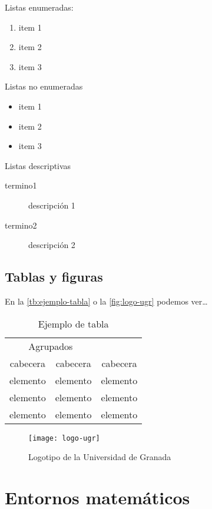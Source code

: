 Listas enumeradas:
\begin{enumerate}
  \item item 1
  \item item 2
  \item item 3
\end{enumerate}

Listas no enumeradas
\begin{itemize}
  \item item 1
  \item item 2
  \item item 3
  \end{itemize}

Listas descriptivas
\begin{description}
  \item[termino1] descripción 1
  \item[termino2] descripción 2
\end{description}

\subsection{Tablas y figuras}

En la \autoref{tb:ejemplo-tabla} o la \autoref{fig:logo-ugr} podemos ver\ldots

\begin{table}[htpb]
  \centering
  \begin{tabular}{ccc} \toprule
    \multicolumn{2}{c}{Agrupados} \\ \cmidrule(r){1-2}
    cabecera & cabecera & cabecera          \\ \midrule
    elemento & elemento & elemento          \\
    elemento & elemento & elemento          \\
    elemento & elemento & elemento          \\ \bottomrule
  \end{tabular}
  \caption{Ejemplo de tabla}
  \label{tb:ejemplo-tabla}
\end{table}

\begin{figure}[htpb]
  \centering
  \texttt{[image: logo-ugr]}
  \caption{Logotipo de la Universidad de Granada}
  \label{fig:logo-ugr}
\end{figure}

\section{Entornos matemáticos}

